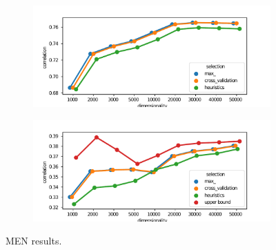 \begin{figure}
  \centering

  \begin{subfigure}[t]{0.49\textwidth}
    \includegraphics[width=\textwidth]{supplement/figures/men-results}
    \caption{}
    \label{fig:men-results}
  \end{subfigure}
  \begin{subfigure}[t]{0.49\textwidth}
    \includegraphics[width=\textwidth]{supplement/figures/men-transfer}
    \caption{}
    \label{fig:men-transfer}
  \end{subfigure}

  \caption{MEN results.}
  \label{fig:men}
\end{figure}

